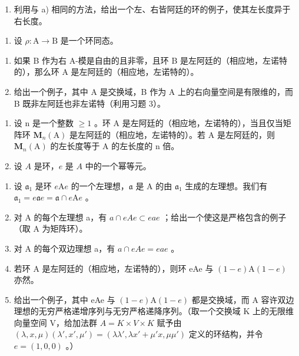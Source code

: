 \begin{enumerate}
\def\labelenumi{\alph{enumi})}
\setcounter{enumi}{2}
\tightlist
\item
  利用与 a) 相同的方法，给出一个左、右皆阿廷的环的例子，使其左长度异于右长度。
\end{enumerate}

\begin{enumerate}
\def\labelenumi{\arabic{enumi})}
\setcounter{enumi}{3}
\tightlist
\item
  设 \(\rho : \mathrm{A} \to \mathrm{B}\) 是一个环同态。
\end{enumerate}

\begin{enumerate}
\def\labelenumi{\alph{enumi})}
\item
  如果 B 作为右 A-模是自由的且非零，且环 B 是左阿廷的（相应地，左诺特的），那么环 A 是左阿廷的（相应地，左诺特的）。
\item
  给出一个例子，其中 A 是交换域，B 作为 A 上的右向量空间是有限维的，而 B 既非左阿廷也非左诺特（利用习题 3）。
\end{enumerate}

\begin{enumerate}
\def\labelenumi{\arabic{enumi})}
\setcounter{enumi}{4}
\item
  设 n 是一个整数 \(\geqslant 1\) 。环 A 是左阿廷的（相应地，左诺特的），当且仅当矩阵环 \(\mathbf{M}_{n}(\mathrm{A})\) 是左阿廷的（相应地，左诺特的）。若 A 是左阿廷的，则 \(\mathbf{M}_{n}(\mathrm{A})\) 的左长度等于 A 的左长度的 n 倍。
\item
  设 \(A\) 是环，\(e\) 是 \(A\) 中的一个幂等元。
\end{enumerate}

\begin{enumerate}
\def\labelenumi{\alph{enumi})}
\item
  设 \(\mathfrak{a}_1\) 是环 \(e\mathrm{A}e\) 的一个左理想，\(\mathfrak{a}\) 是 A 的由 \(\mathfrak{a}_1\) 生成的左理想。我们有 \(\mathfrak{a}_1 = e\mathfrak{a}e = \mathfrak{a} \cap e\mathrm{A}e\) 。
\item
  对 A 的每个左理想 a，有 \(a \cap eAe \subset eae\) ；给出一个使这是严格包含的例子（取 A 为矩阵环）。
\item
  对 A 的每个双边理想 a，有 \(a \cap eAe = eae\) 。
\item
  若环 A 是左阿廷的（相应地，左诺特的），则环 eAe 与 \((1-e)\mathrm{A}(1-e)\) 亦然。
\item
  给出一个例子，其中 eAe 与 \((1-e)\mathrm{A}(1-e)\) 都是交换域，而 A 容许双边理想的无穷严格递增序列与无穷严格递降序列。（取一个交换域 K 上的无限维向量空间 V，给加法群 \(A=K\times V\times K\) 赋予由 \((\lambda,x,\mu)(\lambda',x',\mu')=(\lambda\lambda',\lambda x'+\mu'x,\mu\mu')\) 定义的环结构，并令 \(e=(1,0,0)\) 。）
\end{enumerate}

